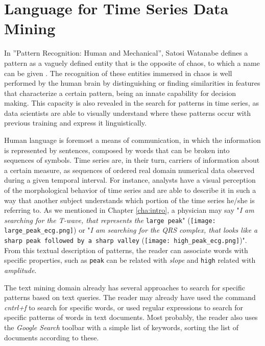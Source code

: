 
%

\chapter{Language for Time Series Data Mining}
\label{cha:text_}

In ”Pattern Recognition: Human and Mechanical”, Satosi Watanabe defines a pattern as a vaguely defined entity that is the opposite of chaos, to which a name can be given \cite{watanabe}. The recognition of these entities immersed in chaos is well performed by the human brain by distinguishing or finding similarities in features that characterize a certain pattern, being an innate capability for decision making. This capacity is also revealed in the search for patterns in time series, as data scientists are able to visually understand where these patterns occur with previous training and express it linguistically. 
\par
Human language is foremost a means of communication, in which the information is represented by sentences, composed by words that can be broken into sequences of symbols. Time series are, in their turn, carriers of information about a certain measure, as sequences of ordered real domain numerical data observed during a given temporal interval. For instance, analysts have a visual perception of the morphological behavior of time series and are able to describe it in such a way that another subject understands which portion of the time series he/she is referring to. As we mentioned in Chapter \ref{cha:intro}, a physician may say "\textit{I am searching for the T-wave, that represents the} \texttt{large peak}" (\texttt{[image: large\_peak\_ecg.png]}) or "\textit{I am searching for the QRS complex, that looks like a} \texttt{sharp peak followed by a sharp valley} (\texttt{[image: high\_peak\_ecg.png]})". From this textual description of patterns, the reader can associate words with specific properties, such as \texttt{peak} can be related with \textit{slope} and \texttt{high} related with \textit{amplitude}.
\par
The text mining domain already has several approaches to search for specific patterns based on text queries. The reader may already have used the command \textit{cntrl+f} to search for specific words, or used regular expressions to search for specific patterns of words in text documents. Most probably, the reader also uses the \textit{Google Search} toolbar with a simple list of keywords, sorting the list of documents according to these.
